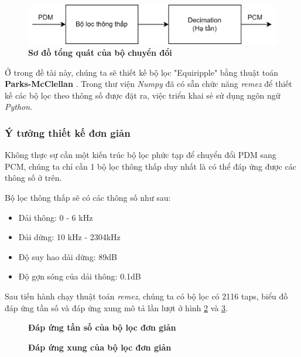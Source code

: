 \begin{figure}[H]
    \centering
    \includegraphics[width=12cm]{Images/Chuong3/pdm2pcm_top.png}
    \caption[Sơ đồ tổng quát của bộ chuyển đổi]{\bfseries \fontsize{12pt}{0pt}\selectfont Sơ đồ tổng quát của bộ chuyển đổi}
    \label{pdm2pcm_top}
\end{figure}
Ở trong đề tài này, chúng ta sẽ thiết kế bộ lọc "Equiripple" bằng thuật toán \textbf{Parks-McClellan} \cite{rao2018digital}. Trong thư viện \textit{Numpy} đã có sẵn chức năng \textit{remez} để thiết kế các bộ lọc theo thông số được đặt ra, việc triển khai sẻ sử dụng ngôn ngữ \textit{Python}.
\subsubsection{Ý tưởng thiết kế đơn giản} \label{dongian}
Không thực sự cần một kiến trúc bộ lọc phức tạp để chuyển đổi PDM sang PCM, chúng ta chỉ cần 1 bộ lọc thông thấp duy nhất là có thể đáp ứng được các thông số ở trên.

Bộ lọc thông thấp sẽ có các thông số như sau: 
\begin{itemize}
    \item Dải thông: 0 - 6 kHz
    \item Dải dừng: 10 kHz - 2304kHz
    \item Độ suy hao dải dừng: 89dB
    \item Độ gợn sóng của dải thông: 0.1dB
\end{itemize}

Sau tiến hành chạy thuật toán \textit{remez}, chúng ta có bộ lọc có 2116 taps,  biểu đồ đáp ứng tần số và đáp ứng xung mô tả lần lượt ở hình \ref{filter_the_damn_thing} và \ref{filter_the_damn_thing_impulse}.
\begin{figure}[H]
    \centering
    
    \caption[Đáp ứng tần số của bộ lọc đơn giản]{\bfseries \fontsize{12pt}{0pt}\selectfont Đáp ứng tần số của bộ lọc đơn giản}
    \label{filter_the_damn_thing}
\end{figure}
\begin{figure}[H]
    \centering
    
    \caption[Đáp ứng xung của bộ lọc đơn giản]{\bfseries \fontsize{12pt}{0pt}\selectfont Đáp ứng xung của bộ lọc đơn giản}
    \label{filter_the_damn_thing_impulse}
\end{figure}

